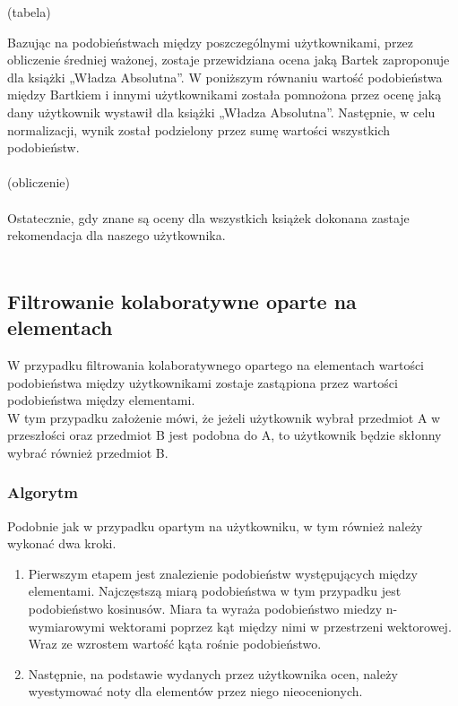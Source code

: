 \documentclass[12pt,a4paper]{report}
\begin{document}
{(tabela)

Bazując na podobieństwach między poszczególnymi użytkownikami, przez obliczenie średniej ważonej, zostaje przewidziana ocena jaką Bartek zaproponuje dla książki „Władza Absolutna”. W poniższym równaniu wartość podobieństwa między Bartkiem i innymi użytkownikami została pomnożona przez ocenę jaką dany użytkownik wystawił dla książki „Władza Absolutna”. Następnie, w celu normalizacji, wynik został podzielony przez sumę wartości wszystkich podobieństw.
\\
\\(obliczenie)
\\
\\Ostatecznie, gdy znane są oceny dla wszystkich książek dokonana zastaje rekomendacja dla naszego użytkownika.
\\
\\
\subsection{Filtrowanie kolaboratywne oparte na  elementach}
W przypadku filtrowania kolaboratywnego opartego na elementach wartości podobieństwa między użytkownikami zostaje zastąpiona przez  wartości podobieństwa między elementami.
\\W tym przypadku założenie mówi, że jeżeli użytkownik wybrał przedmiot A w przeszłości oraz przedmiot B jest podobna do A, to użytkownik będzie skłonny wybrać również przedmiot B.
\subsubsection{Algorytm}
Podobnie jak w przypadku opartym na użytkowniku, w tym również należy wykonać dwa kroki.
\begin{enumerate}
\item Pierwszym etapem jest znalezienie podobieństw występujących między elementami. Najczęstszą miarą podobieństwa w tym przypadku jest podobieństwo kosinusów. Miara ta wyraża podobieństwo miedzy n-wymiarowymi wektorami poprzez kąt między nimi w przestrzeni wektorowej. Wraz ze wzrostem wartość kąta rośnie podobieństwo.
\item Następnie, na podstawie wydanych przez użytkownika ocen, należy wyestymować noty dla elementów przez niego nieocenionych.
\end{enumerate}

}
\end{document}
